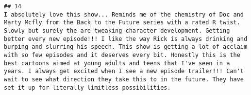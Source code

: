 \documentclass[
]{article}
\begin{document}
\begin{verbatim}
## 14                                                                                                                                                                                                                                                                                                                                                                                                                                                                                                                                                                                                                                                                                                                                                                                                                                                                                                                                                                                                                                                                                                                                                                                                                                                                                                                                                                                                                                                                                                                                                                                                                                                                                                                                                      I absolutely love this show... Reminds me of the chemistry of Doc and Marty Mcfly from the Back to the Future series with a rated R twist. Slowly but surely the are tweaking character development. Getting better every new episode!!! I like the way Rick is always drinking and burping and slurring his speech. This show is getting a lot of acclaim with so few episodes and it deserves every bit. Honestly this is the best cartoons aimed at young adults and teens that I've seen in a years. I always get excited when I see a new episode trailer!!! Can't wait to see what direction they take this to in the future. They have set it up for literally limitless possibilities.

\end{verbatim}
\end{document}
